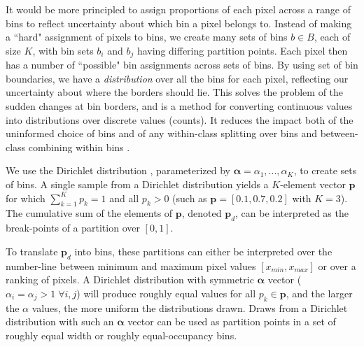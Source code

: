\documentclass[
    ,final            %
  ]
  {aipproc}
\begin{document}
It would be more principled to assign proportions of each pixel across a range of bins to reflect uncertainty about which bin a pixel belongs to.
Instead of making a ``hard" assignment of pixels to bins,
we create many sets of bins $b \in B$, each of size $K$, with bin sets $b_i$ and $b_j$ having differing partition points. Each pixel then has a number of ``possible" bin assignments across sets of bins.
By using set of bin boundaries, 
we have a {\it distribution} over all the bins for each pixel, reflecting our uncertainty about where the borders should lie.
This solves the problem of the sudden changes at bin borders, and is a method for converting continuous values into distributions over discrete values (counts). It reduces the impact both of the uninformed choice of bins and of any within-class splitting over bins and between-class combining within bins \cite{clarke2000entropy}.

We use the Dirichlet distribution \cite{frigyik2010introduction,hoadley1969compound,ng2011dirichlet}, parameterized by $\boldsymbol{\alpha} = \alpha_1,...,\alpha_K$, to create sets of bins.
A single sample from a Dirichlet distribution
yields a $K$-element vector $\mathbf{p}$ for which $\sum_{k=1}^K p_k =
1$ and all $p_k > 0$ (such as $\mathbf{p}=[0.1,0.7,0.2]$ with
$K=3$). The cumulative sum of the elements of $\mathbf{p}$, denoted
$\mathbf{p}_d$, can be interpreted as the break-points of a partition
over $[0,1]$. %

To translate $\mathbf{p}_d$ into bins, these partitions can either be
interpreted over the number-line between minimum and maximum pixel
values $[x_{min}, x_{max}]$ or over a ranking of pixels.  A Dirichlet
distribution with symmetric $\boldsymbol{\alpha}$ vector ($\alpha_i
= \alpha_j > 1 \; \forall i,j$) will produce roughly equal values for
all $p_k \in \mathbf{p}$, and the larger the $\alpha$ values, the more
uniform the distributions drawn. Draws from a Dirichlet distribution
with such an $\boldsymbol{\alpha}$ vector can be used as partition
points in a set of roughly equal width or roughly equal-occupancy
bins.
\end{document}
